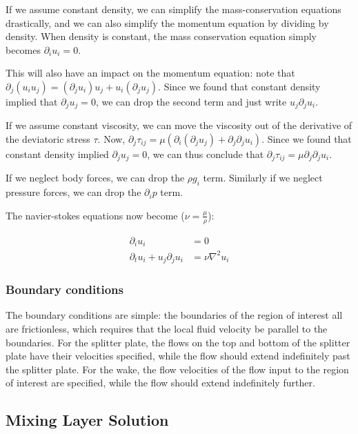 \documentclass{article}
\begin{document}
If we assume constant density, we can simplify the mass-conservation
	equations drastically, and we can also simplify the momentum 
	equation by dividing by density. 
When density is constant, the mass conservation equation simply becomes
	$\partial_i u_i = 0$.

This will also have an impact on the momentum equation: note that 
	$\partial_j \left( u_i u_j \right) =
	\left( \partial_j u_i \right) u_j 
	+ u_i \left( \partial_j u_j \right)$.
Since we found that constant density implied that $\partial_j u_j = 0$,
	we can drop the second term and just write $u_j \partial_j u_i$.

If we assume constant viscosity, we can move the viscosity out of the 
	derivative of the deviatoric stress $\tau$.
Now, $\partial_j \tau_{ij} = \mu \left( \partial_i 
	\left( \partial_j u_j \right) + \partial_j \partial_j u_i \right)$.
Since we found that constant density implied $\partial_j u_j = 0$,
	we can thus conclude that $\partial_j \tau_{ij} 
	= \mu \partial_j \partial_j u_i$.

If we neglect body forces, we can drop the $\rho g_i$ term.
Similarly if we neglect pressure forces, we can drop the $\partial_i p$ term.

The navier-stokes equations now become ($\nu = \frac{\mu}{\rho}$):

\begin{align}
\partial_i u_i & = 0 \\
\partial_t u_i + u_j \partial_j u_i & = \nu \nabla^2 u_i
\end{align}

\subsubsection{Boundary conditions}

The boundary conditions are simple: the boundaries of the region of interest
	all are frictionless, which requires that the local fluid velocity
	be parallel to the boundaries.
For the splitter plate, the flows on the top and bottom of the splitter
	plate have their velocities specified, while the flow should
	extend indefinitely past the splitter plate.
For the wake, the flow velocities of the flow input to the region of interest
	are specified, while the flow should extend indefinitely further.

\subsection{Mixing Layer Solution}
\end{document}
